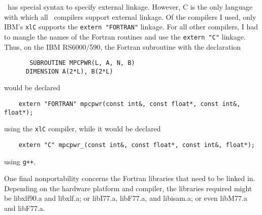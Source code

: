 \CC\ has special syntax to specify external linkage.
However,
C is the only language with which all \CC\ compilers support external
linkage.
Of the compilers I used,
only IBM's \verb|xlC| supports the \verb|extern "FORTRAN"| linkage.
For all other compilers,
I had to mangle the names of the Fortran routines and use the
\verb|extern "C"| linkage.
Thus,
on the IBM RS6000/590,
the Fortran subroutine with the declaration
\begin{verbatim}
       SUBROUTINE MPCPWR(L, A, N, B)
      DIMENSION A(2*L), B(2*L)
\end{verbatim}
would be declared
\begin{verbatim}
    extern "FORTRAN" mpcpwr(const int&, const float*, const int&, float*);
\end{verbatim}
using the \verb|xlC| compiler,
while it would be declared
\begin{verbatim}
    extern "C" mpcpwr_(const int&, const float*, const int&, float*);
\end{verbatim}
using \verb|g++|.

One final nonportability concerns the Fortran libraries that need to
be linked in.
Depending on the hardware platform and compiler,
the libraries required might be libxlf90.a and libxlf.a;
or libI77.a, libF77.a, and libisam.a;
or even libM77.a and libF77.a.





